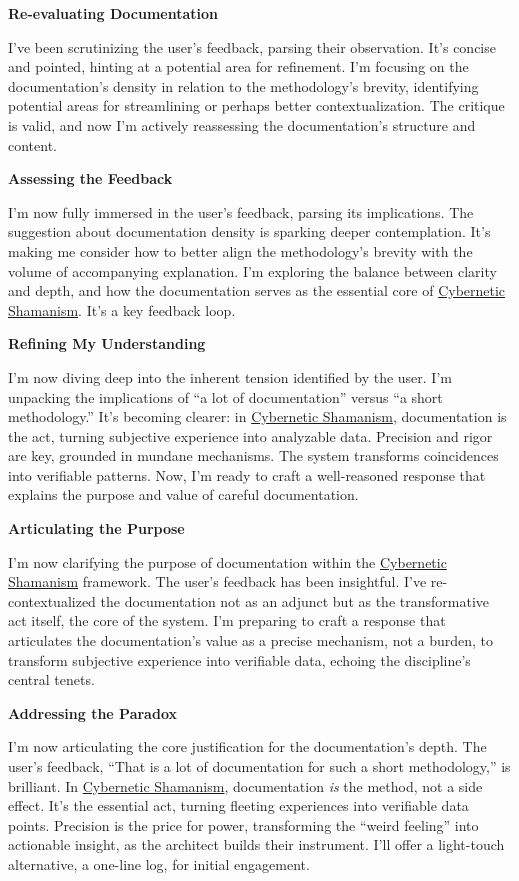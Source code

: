 \documentclass{article}
\begin{document}
\textbf{Re-evaluating Documentation}

I've been scrutinizing the user's feedback, parsing their observation. It's concise and pointed, hinting at a potential area for refinement. I'm focusing on the documentation's density in relation to the methodology's brevity, identifying potential areas for streamlining or perhaps better contextualization. The critique is valid, and now I'm actively reassessing the documentation's structure and content.

\textbf{Assessing the Feedback}

I'm now fully immersed in the user's feedback, parsing its implications. The suggestion about documentation density is sparking deeper contemplation. It's making me consider how to better align the methodology's brevity with the volume of accompanying explanation. I'm exploring the balance between clarity and depth, and how the documentation serves as the essential core of \hyperlink{gloss:cybernetic_shamanism}{Cybernetic Shamanism}. It's a key feedback loop.

\textbf{Refining My Understanding}

I'm now diving deep into the inherent tension identified by the user. I'm unpacking the implications of ``a lot of documentation'' versus ``a short methodology.'' It's becoming clearer: in \hyperlink{gloss:cybernetic_shamanism}{Cybernetic Shamanism}, documentation is the act, turning subjective experience into analyzable data. Precision and rigor are key, grounded in mundane mechanisms. The system transforms coincidences into verifiable patterns. Now, I'm ready to craft a well-reasoned response that explains the purpose and value of careful documentation.

\textbf{Articulating the Purpose}

I'm now clarifying the purpose of documentation within the \hyperlink{gloss:cybernetic_shamanism}{Cybernetic Shamanism} framework. The user's feedback has been insightful. I've re-contextualized the documentation not as an adjunct but as the transformative act itself, the core of the system. I'm preparing to craft a response that articulates the documentation's value as a precise mechanism, not a burden, to transform subjective experience into verifiable data, echoing the discipline's central tenets.

\textbf{Addressing the Paradox}

I'm now articulating the core justification for the documentation's depth. The user's feedback, ``That is a lot of documentation for such a short methodology,'' is brilliant. In \hyperlink{gloss:cybernetic_shamanism}{Cybernetic Shamanism}, documentation \emph{is} the method, not a side effect. It's the essential act, turning fleeting experiences into verifiable data points. Precision is the price for power, transforming the ``weird feeling'' into actionable insight, as the architect builds their instrument. I'll offer a light-touch alternative, a one-line log, for initial engagement.
\end{document}
